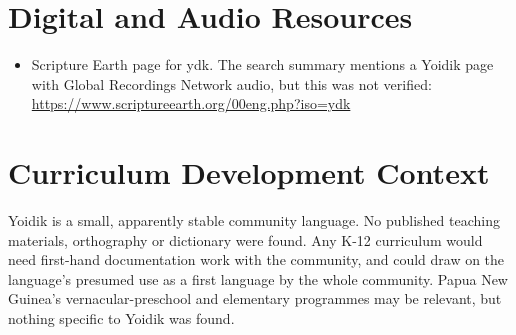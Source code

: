 \documentclass[12pt]{article}
\begin{document}
\section{Digital and Audio Resources}
\begin{itemize}
\item Scripture Earth page for ydk. The search summary mentions a Yoidik page with Global Recordings Network audio, but this was not verified: \url{https://www.scriptureearth.org/00eng.php?iso=ydk}
\end{itemize}

\section{Curriculum Development Context}
Yoidik is a small, apparently stable community language. No published teaching materials, orthography or dictionary were found. Any K-12 curriculum would need first-hand documentation work with the community, and could draw on the language's presumed use as a first language by the whole community. Papua New Guinea's vernacular-preschool and elementary programmes may be relevant, but nothing specific to Yoidik was found.
\end{document}
